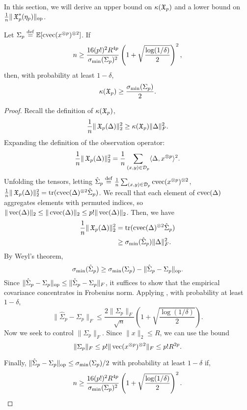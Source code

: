 In this section, we will derive an upper bound on $\kappa(\operatorname{\mathfrak{X}}_p)$ and
a lower bound on $\frac{1}{n} \| \operatorname{\mathfrak{X}}_p^*(\eta_p) \|_{\text{\rm op}}$.

\begin{lemma}
\label{lem:lowRankLower}
Let $\Sigma_p \stackrel{\rm def}{=} \operatorname{\mathbb{E}}[\operatorname{cvec}(x^{\otimes p})^{\otimes 2}]$.
If $$n \ge \frac{16 (p!)^2 R^{4p}}{\sigma_\text{\rm min}(\Sigma_p)^2} \left(1 + \sqrt{\frac{\log(1/\delta)}{2}}\right)^2,$$
then, with probability at least $1-\delta$,
$$\kappa(\operatorname{\mathfrak{X}}_p) \ge \frac{\sigma_\text{\rm min}(\Sigma_p)}{2}.$$
\end{lemma}

\begin{proof}
  Recall the definition of $\kappa(\operatorname{\mathfrak{X}}_p)$, 
  $$\frac{1}{n} \|\operatorname{\mathfrak{X}}_p(\Delta)\|_2^2 \ge \kappa(\operatorname{\mathfrak{X}}_p) \|\Delta\|^2_F.$$
Expanding the definition of the observation operator:
$$\frac{1}{n} \|\operatorname{\mathfrak{X}}_p(\Delta)\|_2^2 = \frac{1}{n} \sum_{(x,y) \in \mathcal{D}_p} \langle \Delta, x^{\otimes p} \rangle^2.$$
Unfolding the tensors, letting $\hat\Sigma_p \stackrel{\rm def}{=} \frac{1}{n}
\sum_{(x,y) \in \mathcal{D}_p} \operatorname{cvec}(x^{\otimes p})^{\otimes 2}$, $\frac{1}{n}
\|\operatorname{\mathfrak{X}}_p(\Delta)\|_2^2 = \operatorname{tr}(\operatorname{cvec}(\Delta)^{\otimes 2} \hat\Sigma_p)$. 
We recall that each element of $\operatorname{cvec}(\Delta)$ aggregates elements with
permuted indices, so $\|\operatorname{vec}(\Delta)\|_2 \le \|\operatorname{cvec}(\Delta)\|_2 \le p!
\|\operatorname{vec}(\Delta)\|_2$. Then, we have 
\begin{align*}
\frac{1}{n} \|\operatorname{\mathfrak{X}}_p(\Delta)\|_2^2 
  &= \operatorname{tr}(\operatorname{cvec}(\Delta)^{\otimes 2} \hat\Sigma_p) \\
  &\ge \sigma_\text{\rm min}(\hat\Sigma_p) \|\Delta\|_F^2 .
\end{align*}
By Weyl's theorem, $$\sigma_\text{\rm min}(\hat\Sigma_p) \ge
\sigma_\text{\rm min}(\Sigma_p) - \|\hat\Sigma_p - \Sigma_p\|_{\textrm{op}}.$$
Since $\|\hat\Sigma_p - \Sigma_p\|_{\textrm{op}} \le \|\hat\Sigma_p - \Sigma_p\|_{F}$,
it suffices to show that the empirical covariance concentrates in Frobenius norm.
Applying , with
probability at least $1 - \delta$, $$\| \hat\Sigma_p - \Sigma_p \|_F
\le \frac{2 \|\Sigma_p\|_F}{\sqrt n} \left( 1 + \sqrt{\frac{\log(1/\delta)}{2}} \right).$$
Now we seek to control $\|\Sigma_p\|_F$.
Since $\|x\|_2 \le R$, we can use the
bound $$\| \Sigma_p \|_F \le p! \| \operatorname{vec}(x^{\otimes p})^{\otimes 2} \|_F \le p! R^{2p}.$$

Finally, $\|\hat\Sigma_p - \Sigma_p\|_{\text{\rm op}} \le \sigma_\text{\rm min}(\Sigma_p)/2$ with probability at least $1 - \delta$ if,
$$n \ge \frac{16 (p!)^2 R^{4p}}{\sigma_\text{\rm min}(\Sigma_p)^2} \left(1 + \sqrt{\frac{\log(1/\delta)}{2}}\right)^2.$$


\end{proof}
